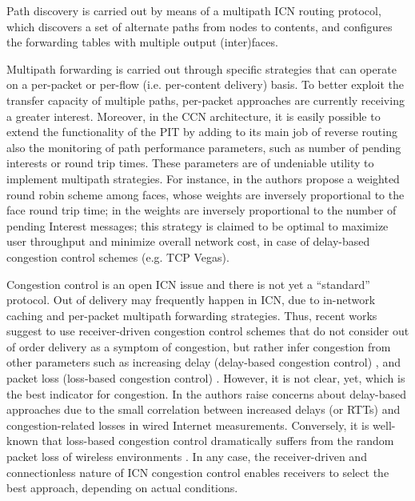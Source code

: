 \documentclass{sig-alternate-10pt}
\begin{document}
Path discovery is carried out by means of a multipath ICN routing protocol, which discovers a set of alternate paths from nodes to contents, and configures the forwarding tables with multiple output (inter)faces.


Multipath forwarding is carried out through specific strategies that can operate on a per-packet or per-flow (i.e. per-content delivery) basis. To better exploit the transfer capacity of multiple paths, per-packet approaches are currently receiving a greater interest. Moreover, in the CCN architecture, it is easily possible to extend the functionality of the PIT by adding to its main job of reverse routing also the monitoring of path performance parameters, such as number of pending interests or round trip times. These parameters are of undeniable utility to implement multipath strategies. For instance, in \cite{udugama} the authors propose a weighted round robin scheme among faces, whose weights are inversely proportional to the face round trip time; in \cite{carofigliooptimal} the weights are inversely proportional to the number of pending Interest messages; this strategy is claimed to be optimal to maximize user throughput and minimize overall network cost, in case of delay-based congestion control schemes (e.g. TCP Vegas).

Congestion control is an open ICN issue and there is not yet a ``standard'' protocol. Out of delivery may frequently happen in ICN, due to in-network caching and per-packet multipath forwarding strategies. Thus, recent works suggest to use receiver-driven congestion control schemes that do not consider out of order delivery as a  symptom of congestion, but rather infer congestion from other parameters such as increasing delay (delay-based congestion control) \cite{carofigliooptimal}\cite{carofigliomultipath}, and packet loss (loss-based congestion control) \cite{braun2013empirical} \cite{saino2013cctcp}. However, it is not clear, yet, which is the best indicator for congestion. In \cite{prasad2004effectiveness} the authors raise concerns about delay-based approaches due to the small correlation between increased delays (or RTTs) and congestion-related losses in wired Internet measurements. Conversely, it is well-known that loss-based congestion control dramatically suffers from the random packet loss of wireless environments \cite{balakrishnan1997comparison}. In any case, the receiver-driven and connectionless nature of ICN congestion control enables receivers to select the best approach, depending on actual conditions.
\end{document}
